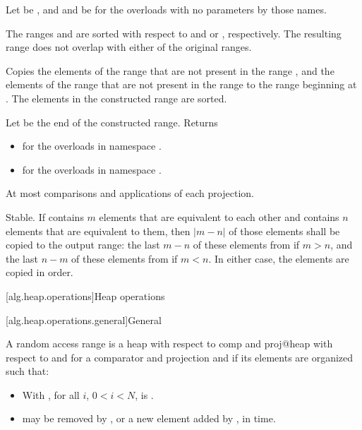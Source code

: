 \begin{itemdescr}
\pnum
Let  be ,
and  and  be 
for the overloads with no parameters by those names.

\pnum
\expects
The ranges  and  are sorted
with respect to  and  or , respectively.
The resulting range does not overlap with either of the original ranges.

\pnum
\effects
Copies the elements of the range 
that are not present in the range ,
and the elements of the range 
that are not present in the range 
to the range beginning at .
The elements in the constructed range are sorted.

\pnum
\returns
Let  be the end of the constructed range.
Returns
\begin{itemize}
\item
  for the overloads in namespace .
\item
  for the overloads in namespace .
\end{itemize}

\pnum
\complexity
At most 
comparisons and applications of each projection.

\pnum
\remarks
Stable.
If  contains $m$ elements
that are equivalent to each other and
 contains $n$ elements
that are equivalent to them,
then $|m - n|$ of those elements shall be copied to the output range:
the last $m - n$ of these elements from  if $m > n$, and
the last $n - m$ of these elements from  if $m < n$.
In either case, the elements are copied in order.
\end{itemdescr}

[alg.heap.operations]{Heap operations}

[alg.heap.operations.general]{General}

\pnum
A random access range  is a
{heap with respect to comp and proj@heap with respect to  and }
for a comparator and projection  and 
if its elements are organized such that:
\begin{itemize}
\item
  With , for all $i$, $0 < i < N$,
  is .
\item
   may be removed by , or
  a new element added by ,
  in  time.
\end{itemize}

